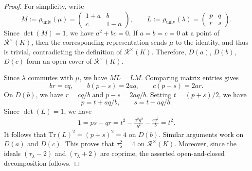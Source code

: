 \documentclass[12pt,reqno]{amsart}
\newcommand{\calR}{\mathcal{R}}
\newcommand{\Tr}{\mathrm{Tr}}
\theoremstyle{definition}
\begin{document}
	\begin{proof}
		For simplicity,  write
		\[
		      M:=\rho_{\mathrm{univ}}(\mu) =
    		\begin{pmatrix}
    			1+a & b\\
    			c & 1-a
    		\end{pmatrix}, \qquad
    		L:=\rho_{\mathrm{univ}}(\lambda) =
    		\begin{pmatrix}
    			p&q\\
    			r&s
    		\end{pmatrix}.
		\]
		Since $\det(M)=1$, we have $a^2+bc=0$. If $a=b=c=0$ at a point of $\calR^\times(K)$, then the corresponding representation sends $\mu$ to the identity, and thus is trivial, contradicting the definition of $\calR^\times(K)$. Therefore, $D(a)$, $D(b)$, $D(c)$ form an open cover of $\calR^\times(K)$.
		
		Since $\lambda$ commutes with $\mu$, we have $ML=LM$. Comparing matrix entries gives
		\[
		      br=cq, \qquad b(p-s)=2aq, \qquad c(p-s)=2ar.
		\]
		On $D(b)$, we have $r = cq/b$ and $p-s = 2aq/b$. Setting $t= (p+s)/2$, we have
		\[
		      p=t+aq/b, \qquad s=t-aq/b.
		\]
		Since $\det(L)=1$, we have 
		\begin{align*}
			1 =ps-qr =t^2-\frac{a^2q^2}{b^2}-\frac{cq^2}{b}	=t^2.
		\end{align*}
		It follows that $\Tr(L)^2=(p+s)^2=4$  on $D(b)$. Similar arguments work on $D(a)$ and $D(c)$. This proves that $\tau_\lambda^2=4$ on $\calR^\times(K)$.  Moreover, since the ideals $(\tau_\lambda-2)$ and
		$(\tau_\lambda+2)$ are coprime, the asserted open-and-closed decomposition follows.
	\end{proof}
	
\end{document}
